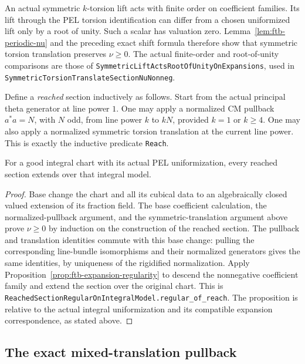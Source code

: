 An actual symmetric \(k\)-torsion lift acts with finite order on
coefficient families.
Its lift through the PEL torsion identification can differ from a
chosen uniformized lift only by a root of unity.
Such a scalar has valuation zero.
Lemma~\ref{lem:ftb-periodic-nu} and the preceding exact shift formula
therefore show that symmetric torsion translation preserves
\(\nu\ge0\).
The actual finite-order and root-of-unity comparisons are those of
\texttt{SymmetricLiftActsRootOfUnityOnExpansions}, used in
\texttt{SymmetricTorsionTranslateSectionNuNonneg}.

Define a \emph{reached} section inductively as follows.
Start from the actual principal theta generator at line power \(1\).
One may apply a normalized CM pullback
\(a^*a=N\), with \(N\) odd, from line power \(k\) to \(kN\),
provided \(k=1\) or \(k\ge4\).
One may also apply a normalized symmetric torsion translation at
the current line power.
This is exactly the inductive predicate \texttt{Reach}.

\begin{srproposition}
\label{prop:ftb-reached-regular}
For a good integral chart with its actual PEL uniformization,
every reached section extends over that integral model.
\end{srproposition}
\begin{proof}
Base change the chart and all its cubical data to an algebraically
closed valued extension of its fraction field.
The base coefficient calculation, the normalized-pullback argument,
and the symmetric-translation argument above prove \(\nu\ge0\)
by induction on the construction of the reached section.
The pullback and translation identities commute with this base
change: pulling the corresponding line-bundle isomorphisms and their
normalized generators gives the same identities, by uniqueness of
the rigidified normalization.
Apply Proposition~\ref{prop:ftb-expansion-regularity} to descend the
nonnegative coefficient family and extend the section over the
original chart.
This is \texttt{ReachedSectionRegularOnIntegralModel.regular\_of\_reach}.
The proposition is relative to the actual integral uniformization
and its compatible expansion correspondence, as stated above.
\end{proof}

\subsection{The exact mixed-translation pullback}
\label{subsec:ftb-mixed-pullback}

